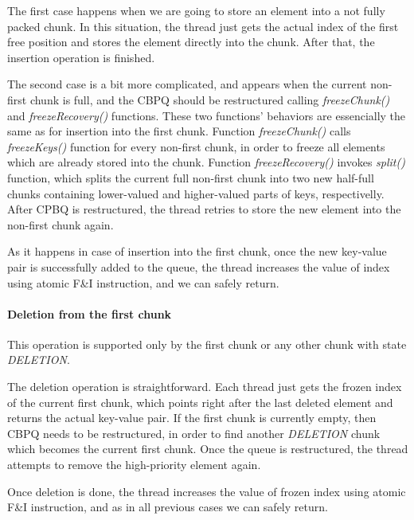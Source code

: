 \documentclass{article}
\begin{document}
The first case happens when we are going to store an element into a not fully packed chunk. In this situation, the thread just gets the actual index of the first free position and stores the element directly into the chunk. After that, the insertion operation is finished.\par

The second case is a bit more complicated, and appears when the current non-first chunk is full, and the CBPQ should be restructured calling \textit{freezeChunk()} and \textit{freezeRecovery()} functions. These two functions' behaviors are essencially the same as for insertion into the first chunk. Function \textit{freezeChunk()} calls \textit{freezeKeys()} function for every non-first chunk, in order to freeze all elements which are already stored into the chunk. Function \textit{freezeRecovery()} invokes \textit{split()} function, which splits the current full non-first chunk into two new half-full chunks containing lower-valued and higher-valued parts of keys, respectivelly. After CPBQ is restructured, the thread retries to store the new element into the non-first chunk again.\par

As it happens in case of insertion into the first chunk, once the new key-value pair is successfully added to the queue, the thread increases the value of index using atomic F\&I instruction, and we can safely return.

\paragraph{Deletion from the first chunk}\mbox{}\par
This operation is supported only by the first chunk or any other chunk with state \emph{DELETION}.\par

The deletion operation is straightforward. Each thread just gets the frozen index of the current first chunk, which points right after the last deleted element and returns the actual key-value pair. If the first chunk is currently empty, then CBPQ needs to be restructured, in order to find another \emph{DELETION} chunk which becomes the current first chunk. Once the queue is restructured, the thread attempts to remove the high-priority element again.\par

Once deletion is done, the thread increases the value of frozen index using atomic F\&I instruction, and as in all previous cases we can safely return.
\pagebreak
\end{document}

